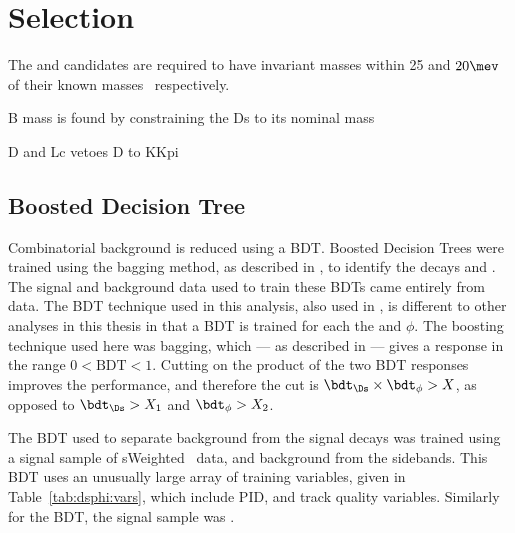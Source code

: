 \section{Selection}

%
%
%
%
%
%






The \decay{\Ds}{\kkpi} and \decay{\phi}{\kk} candidates are required to have invariant masses
within 25 and $20\mev$ of their known masses~\cite{PDG2012} respectively.

B mass is found by constraining the Ds to its nominal mass

D and Lc vetoes
D to KKpi



\subsection{Boosted Decision Tree}
Combinatorial background is reduced using a BDT.
Boosted Decision Trees were trained using the bagging method, as described in , to
identify the decays \decay{\Ds}{\kkpi} and \decay{\phi}{\kk}.
The signal and background data used to train these BDTs came entirely from data.
The BDT technique used in this analysis, also used in , is different to
other analyses in this thesis in that a BDT is trained for each the \Ds and $\phi$.
The boosting technique used here was bagging, which --- as described in  --- gives
a response in the range $0<\mathrm{BDT}<1$.
Cutting on the product of the two BDT responses improves the performance, and therefore the cut is
$\bdt_{\Ds}\times\bdt_\phi>X$, as opposed to $\bdt_{\Ds}>X_1$ and $\bdt_\phi>X_2$.

The BDT used to separate background from the signal \decay{\Ds}{\kkpi} decays was trained using
a signal sample of \decay{\Bs}{\Dsm\pip} sWeighted~\cite{splot} data, and background from the \Dsm
sidebands.
This BDT uses an unusually large array of training variables, given in Table~\ref{tab:dsphi:vars},
which include PID, and track quality variables.
Similarly for the \decay{\phi}{\kk} BDT, the signal sample was \decay{\Bs}{\jpsi\phi}.


